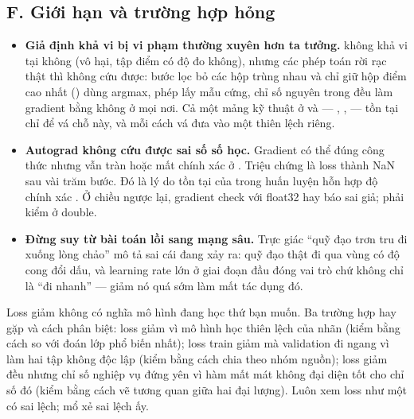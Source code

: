 \documentclass[../../../deep_learning.tex]{subfiles}
\begin{document}
\subsection{F. Giới hạn và trường hợp hỏng}
\begin{itemize}
\item \textbf{Giả định khả vi bị vi phạm thường xuyên hơn ta tưởng.}  không khả vi tại không (vô hại, tập điểm có độ đo không), nhưng các phép toán rời rạc thật thì không cứu được: bước lọc bỏ các hộp trùng nhau và chỉ giữ hộp điểm cao nhất () dùng argmax, phép lấy mẫu cứng, chỉ số nguyên trong  đều làm gradient bằng không ở mọi nơi. Cả một mảng kỹ thuật ở  và  --- , ,  --- tồn tại chỉ để vá chỗ này, và mỗi cách vá đưa vào một thiên lệch riêng.

\item \textbf{Autograd không cứu được sai số số học.} Gradient có thể đúng công thức nhưng vẫn tràn hoặc mất chính xác ở . Triệu chứng là loss thành NaN sau vài trăm bước. Đó là lý do tồn tại của  trong huấn luyện hỗn hợp độ chính xác \cite{micikevicius2018mixed}. Ở chiều ngược lại, gradient check với float32 hay báo sai giả; phải kiểm ở double.
\item \textbf{Đừng suy từ bài toán lồi sang mạng sâu.} Trực giác ``quỹ đạo trơn tru đi xuống lòng chảo'' mô tả sai cái đang xảy ra: quỹ đạo thật đi qua vùng có độ cong đổi dấu, và learning rate lớn ở giai đoạn đầu đóng vai trò  chứ không chỉ là ``đi nhanh'' --- giảm nó quá sớm làm mất tác dụng đó.
\end{itemize}

\begin{cambay}
Loss giảm không có nghĩa mô hình đang học thứ bạn muốn. Ba trường hợp hay gặp và cách phân biệt: loss giảm vì mô hình học thiên lệch của nhãn (kiểm bằng cách so với  đoán lớp phổ biến nhất); loss train giảm mà validation đi ngang vì  làm hai tập không độc lập (kiểm bằng cách chia theo nhóm nguồn); loss giảm đều nhưng chỉ số nghiệp vụ đứng yên vì hàm mất mát không đại diện tốt cho chỉ số đó (kiểm bằng cách vẽ tương quan giữa hai đại lượng). Luôn xem loss như một  có sai lệch;  mổ xẻ sai lệch ấy.
\end{cambay}
\end{document}
